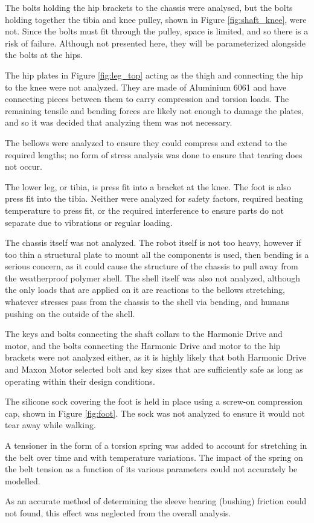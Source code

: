 
The bolts holding the hip brackets to the chassis were analysed, but the bolts holding together the tibia and knee pulley, shown in Figure \ref{fig:shaft_knee}, were not.
Since the bolts must fit through the pulley, space is limited, and so there is a risk of failure.
Although not presented here, they will be parameterized alongside the bolts at the hips.

The hip plates in Figure \ref{fig:leg_top} acting as the thigh and connecting the hip to the knee were not analyzed.
They are made of Aluminium 6061 and have connecting pieces between them to carry compression and torsion loads.
The remaining tensile and bending forces are likely not enough to damage the plates, and so it was decided that analyzing them was not necessary.

The bellows were analyzed to ensure they could compress and extend to the required lengths; no form of stress analysis was done to ensure that tearing does not occur.

The lower leg, or tibia, is press fit into a bracket at the knee.
The foot is also press fit into the tibia.
Neither were analyzed for safety factors, required heating temperature to press fit, or the required interference to ensure parts do not separate due to vibrations or regular loading.

The chassis itself was not analyzed.
The robot itself is not too heavy, however if too thin a structural plate to mount all the components is used, then bending is a serious concern, as it could cause the structure of the chassis to pull away from the weatherproof polymer shell.
The shell itself was also not analyzed, although the only loads that are applied on it are reactions to the bellows stretching, whatever stresses pass from the chassis to the shell via bending, and humans pushing on the outside of the shell.

The keys and bolts connecting the shaft collars to the Harmonic Drive and motor, and the bolts connecting the Harmonic Drive and motor to the hip brackets were not analyzed either, as it is highly likely that both Harmonic Drive and Maxon Motor selected bolt and key sizes that are sufficiently safe as long as operating within their design conditions.

The silicone sock covering the foot is held in place using a screw-on compression cap, shown in Figure \ref{fig:foot}.
The sock was not analyzed to ensure it would not tear away while walking.

A tensioner in the form of a torsion spring was added to account for stretching in the belt over time and with temperature variations.
The impact of the spring on the belt tension as a function of its various parameters could not accurately be modelled.

As an accurate method of determining the sleeve bearing (bushing) friction could not found, this effect was neglected from the overall analysis.